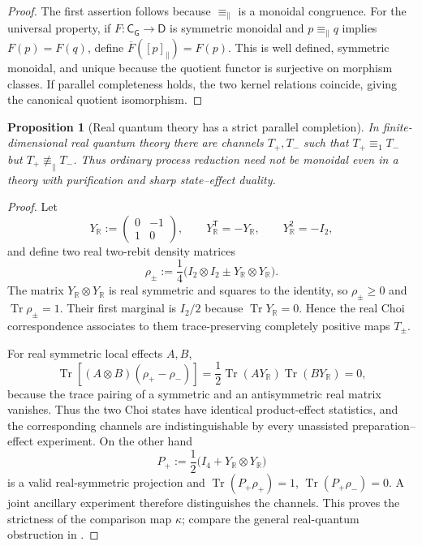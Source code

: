 \documentclass[11pt]{article}
\newtheorem{proposition}[theorem]{Proposition}
\theoremstyle{definition}
\theoremstyle{remark}
\newcommand{\R}{\mathbb R}
\newcommand{\Tr}{\operatorname{Tr}}
\begin{document}
\begin{proof}
The first assertion follows because $\equiv_{\parallel}$ is a monoidal
congruence.  For the universal property, if
$F:\mathsf C_{\mathsf G}\to\mathsf D$ is symmetric monoidal and
$p\equiv_{\parallel}q$ implies $F(p)=F(q)$, define
$\overline F([p]_{\parallel})=F(p)$.  This is well defined, symmetric monoidal,
and unique because the quotient functor is surjective on morphism classes.  If
parallel completeness holds, the two kernel relations coincide, giving the
canonical quotient isomorphism.
\end{proof}

\begin{proposition}[Real quantum theory has a strict parallel completion]
\label{prop:rebit-parallel-counterexample}
In finite-dimensional real quantum theory there are channels $T_+,T_-$ such
that $T_+\equiv_1T_-$ but $T_+\not\equiv_{\parallel}T_-$.  Thus ordinary
process reduction need not be monoidal even in a theory with purification and
sharp state--effect duality.
\end{proposition}

\begin{proof}
Let
\[
 Y_{\R}:=\begin{pmatrix}0&-1\\1&0\end{pmatrix},
 \qquad Y_{\R}^{\mathsf T}=-Y_{\R},
 \qquad Y_{\R}^2=-I_2,
\]
and define two real two-rebit density matrices
\[
 \rho_\pm:=\frac14\bigl(I_2\otimes I_2
              \pm Y_{\R}\otimes Y_{\R}\bigr).
\]
The matrix $Y_{\R}\otimes Y_{\R}$ is real symmetric and squares to the
identity, so $\rho_\pm\ge0$ and $\Tr\rho_\pm=1$.  Their first marginal is
$I_2/2$ because $\Tr Y_{\R}=0$.  Hence the real Choi correspondence associates
to them trace-preserving completely positive maps $T_\pm$.

For real symmetric local effects $A,B$,
\[
 \Tr\!\left[(A\otimes B)(\rho_+-\rho_-)\right]
 =\frac12\Tr(AY_{\R})\Tr(BY_{\R})=0,
\]
because the trace pairing of a symmetric and an antisymmetric real matrix
vanishes.  Thus the two Choi states have identical product-effect statistics,
and the corresponding channels are indistinguishable by every unassisted
preparation--effect experiment.  On the other hand
\[
 P_+:=\frac12\bigl(I_4+Y_{\R}\otimes Y_{\R}\bigr)
\]
is a valid real-symmetric projection and
$\Tr(P_+\rho_+)=1$, $\Tr(P_+\rho_-)=0$.  A joint ancillary experiment therefore
distinguishes the channels.  This proves the strictness of the comparison map
$\kappa$; compare the general real-quantum obstruction in
\cite{BarnumWilce2014}.
\end{proof}
\end{document}

